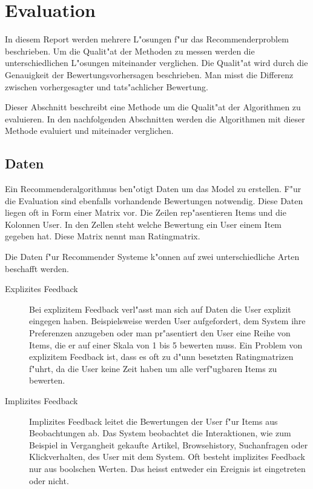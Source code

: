 \documentclass[a4paper, 12pt]{article}
\begin{document}
\section{Evaluation}
\label{sec:evaluation}

In diesem Report werden mehrere L"osungen f"ur das Recommenderproblem beschrieben. Um die Qualit"at der Methoden zu messen werden die unterschiedlichen L"osungen miteinander verglichen. Die Qualit"at wird durch die Genauigkeit der Bewertungsvorhersagen beschrieben. Man misst die Differenz zwischen vorhergesagter und tats"achlicher Bewertung.

Dieser Abschnitt beschreibt eine Methode um die Qualit"at der Algorithmen zu evaluieren. In den nachfolgenden Abschnitten werden die Algorithmen mit dieser Methode evaluiert und miteinader verglichen.

\subsection{Daten}
\label{sec:data}

Ein Recommenderalgorithmus ben"otigt Daten um das Model zu erstellen. F"ur die Evaluation sind ebenfalls vorhandende Bewertungen notwendig. Diese Daten liegen oft in Form einer Matrix vor. Die Zeilen rep"asentieren Items und die Kolonnen User. In den Zellen steht welche Bewertung ein User einem Item gegeben hat. Diese Matrix nennt man Ratingmatrix.

Die Daten f"ur Recommender Systeme k"onnen auf zwei unterschiedliche Arten beschafft werden.

\begin{description}
\item[Explizites Feedback] Bei explizitem Feedback verl"asst man sich auf Daten die User explizit eingegen haben. Beispielsweise werden User aufgefordert, dem System ihre Preferenzen anzugeben oder man pr"asentiert den User eine Reihe von Items, die er auf einer Skala von 1 bis 5 bewerten muss. Ein Problem von explizitem Feedback ist, dass es oft zu d"unn besetzten Ratingmatrizen f"uhrt, da die User keine Zeit haben um alle verf"ugbaren Items zu bewerten.
\item[Implizites Feedback] Implizites Feedback leitet die Bewertungen der User f"ur Items aus Beobachtungen ab. Das System beobachtet die Interaktionen, wie zum Beispiel in Vergangheit gekaufte Artikel, Browsehistory, Suchanfragen oder Klickverhalten, des User mit dem System. Oft besteht implizites Feedback nur aus boolschen Werten. Das heisst entweder ein Ereignis ist eingetreten oder nicht.
\end{description}
\end{document}

